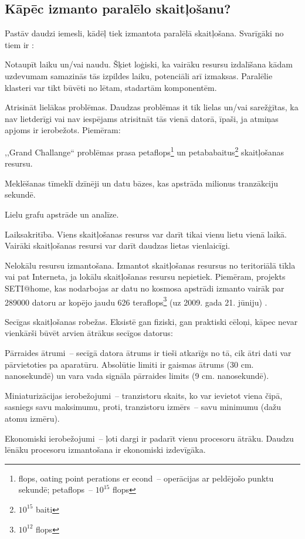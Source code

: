 \subsection{Kāpēc izmanto paralēlo skaitļošanu?}
Pastāv daudzi iemesli, kādēļ tiek izmantota paralēlā skaitļošana. Svarīgāki no tiem ir \cite{IntParComp}:
\begin{dotlist}
	\item Notaupīt laiku un/vai naudu. Šķiet loģiski, ka vairāku resursu izdalīšana kādam
		uzdevumam samazinās tās izpildes laiku, potenciāli arī izmaksas. Paralēlie klasteri var
		tikt būvēti no lētam, stadartām komponentēm.
	\item Atrisināt lielākas problēmas. Daudzas problēmas it tik lielas un/vai sarežģītas, ka
		nav lietderīgi vai nav iespējams atrisitnāt tās vienā datorā, īpaši, ja atmiņas apjoms
		ir ierobežots. Piemēram:
		\begin{dotlist}
			\item ,,Grand Challange`` \cite{GrandChallange} problēmas prasa petaflops\footnote{flops, oating
				point perations er econd~-- operācijas ar peldējošo punktu sekundē;
				petaflops~-- \(10^{15}\) flops} un petababaitus\footnote{\(10^{15}\) baiti} skaitļošanas resursu.
			\item Meklēšanas tīmeklī dzīnēji un datu bāzes, kas apstrāda milionus tranzākciju sekundē.
			\item Lielu grafu apstrāde un analīze.
		\end{dotlist}
	\item Laiksakritība. Viens skaitļošanas resurss var darīt tikai vienu lietu vienā laikā.
		Vairāki skaitļošanas resursi var darīt daudzas lietas vienlaicīgi.
	\item Nelokālu resursu izmantošana. Izmantot skaitļošanas resursus no teritoriālā tīkla
		vai pat Interneta, ja lokālu skaitļošanas resursu nepietiek. Piemēram, projekts SETI@home,
		kas nodarbojas ar datu no kosmosa apstrādi \cite{SETIatHome} izmanto vairāk par 289000
		datoru ar kopējo jaudu 626 teraflops\footnote{\(10^{12}\) flops} (uz 2009. gada 21.
		jūniju) \cite{SETIatHomeStats}.
	\item Secīgas skaitļošanas robežas. Eksistē gan fiziski, gan praktiski cēloņi, kāpec nevar
		vienkārši būvēt arvien ātrākus secīgos datorus:
		\begin{dotlist}
			\item Pārraides ātrumi~-- secīgā datora ātrums ir tieši atkarīģs no tā, cik ātri
				dati var pārvietoties pa aparatūru. Absolūtie limiti ir gaismas ātrums (30 cm.
				nanosekundē) un vara vada signāla pārraides limits (9 cm. nanosekundē).
			\item Miniaturizācijas ierobežojumi~-- tranzistoru skaits, ko var ievietot viena čipā,
				sasniegs savu maksimumu, proti, tranzistoru izmērs~-- savu minimumu (dažu atomu izmēru).
			\item Ekonomiski ierobežojumi~-- ļoti dargi ir padarīt vienu procesoru ātrāku. Daudzu
				lēnāku procesoru izmantošana ir ekonomiski izdevīgāka.
		\end{dotlist}
\end{dotlist}

